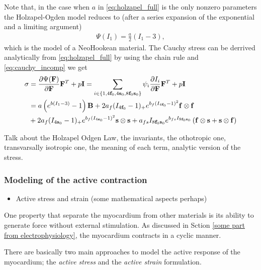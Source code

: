 Note that, in the case when $a$ in \eqref{eq:holzapel_full} is the
only nonzero parameters the Holzapel-Ogden model reduces to (after a
series expansion of the exponential and a limiting argument)
\begin{align}
  \Psi(I_1)  = \frac{a}{2} \left( I_1 - 3 \right), 
\end{align}
which is the model of a NeoHookean material.
The Cauchy stress can be derrived
analytically from \eqref{eq:holzapel_full} by using the chain rule and
\eqref{eq:cauchy_incomp} we get 
\begin{align}
  \begin{split}
    \mathbf{\sigma}
    &= \frac{\partial \Psi(\mathbf{F})}{\partial \mathbf{F}}\mathbf{F}^{T} + p \mathbf{I}
    = \sum_{i \in \left\{ 1, 4\mathbf{f}_0,  4\mathbf{s}_0,  8\mathbf{f}_0\mathbf{s}_0 \right\} }
    \psi_i \frac{\partial I_i}{\partial \mathbf{F}}\mathbf{F}^{T} + p \mathbf{I} \\
    & = a \left( e^{ b (I_1 - 3)}  -1 \right) \mathbf{B} 
    + 2 a_f (I_{4\mathbf{f}_0} - 1)_+  e^{ b_f (I_{4\mathbf{f}_0} - 1)^2} \mathbf{f} \otimes \mathbf{f} \\
    &+ 2 a_f (I_{4\mathbf{s}_0} - 1)_+  e^{ b_f (I_{4\mathbf{s}_0} - 1)^2} \mathbf{s} \otimes \mathbf{s} 
    + a_{fs} I_{8\mathbf{f}_0\mathbf{s}_0}  e^{ b_{fs} I_{8\mathbf{f}_0\mathbf{s}_0}} \left( \mathbf{f} \otimes \mathbf{s}  +  \mathbf{s} \otimes \mathbf{f} \right)
  \end{split}
\end{align}

Talk about the Holzapel Odgen Law, the invariants, the othotropic one,
transvarsally isotropic one, the meaning of each term, analytic
version of the stress.


\subsubsection{Modeling of the active contraction}


\begin{itemize}
  \item Active stress and strain (some mathematical aspects perhaps)
\end{itemize}

  

One property that separate the myocardium from other materials is its
ability to generate force without external stimulation. As discussed
in Sction \ref{some part from electrophysiology}, the myocardium
contracts in a cyclic manner.


There are basically two main approaches to model the active response
of the myocardium; the \emph{active stress} and the \emph{active strain}
formulation.

